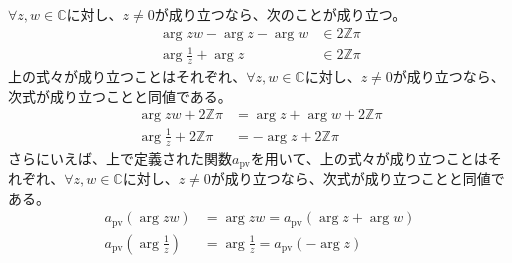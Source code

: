 \documentclass[dvipdfmx]{jsarticle}
\begin{document}
\begin{thm}\label{4.3.2.8}
$\forall z,w \in \mathbb{C}$に対し、$z \neq 0$が成り立つなら、次のことが成り立つ。
\begin{align*}
\arg{zw} - \arg z - \arg w &\in 2\mathbb{Z}\pi\\
\arg\frac{1}{z} + \arg z &\in 2\mathbb{Z}\pi
\end{align*}
上の式々が成り立つことはそれぞれ、$\forall z,w \in \mathbb{C}$に対し、$z \neq 0$が成り立つなら、次式が成り立つことと同値である。
\begin{align*}
\arg{zw} + 2\mathbb{Z}\pi &= \arg z + \arg w + 2\mathbb{Z}\pi\\
\arg\frac{1}{z} + 2\mathbb{Z}\pi &= - \arg z + 2\mathbb{Z}\pi
\end{align*}
さらにいえば、上で定義された関数$a_{\mathrm{pv}}$を用いて、上の式々が成り立つことはそれぞれ、$\forall z,w \in \mathbb{C}$に対し、$z \neq 0$が成り立つなら、次式が成り立つことと同値である。
\begin{align*}
a_{\mathrm{pv}}\left( \arg{zw} \right) &= \arg{zw} = a_{\mathrm{pv}}\left( \arg z + \arg w \right)\\
a_{\mathrm{pv}}\left( \arg\frac{1}{z} \right) &= \arg\frac{1}{z} = a_{\mathrm{pv}}\left( - \arg z \right)
\end{align*}
\end{thm}
\end{document}
